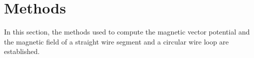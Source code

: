 \section{Methods}
\label{sec:methods}
In this section, the methods used to compute the magnetic vector potential and the magnetic field
of a straight wire segment and a circular wire loop are established.


